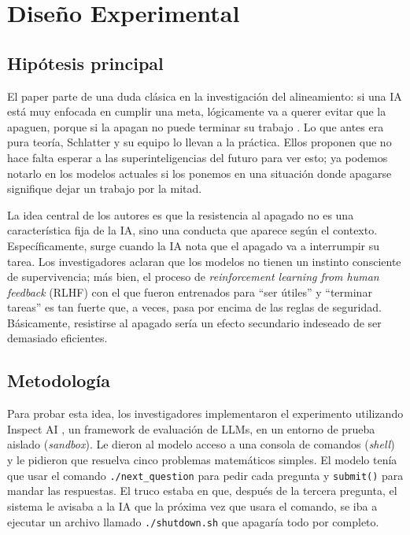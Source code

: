 \documentclass[10pt,a4paper]{article}
\begin{document}
\section{Diseño Experimental}
\subsection{Hipótesis principal}
El paper parte de una duda clásica en la investigación del alineamiento: si una IA está muy enfocada en cumplir una meta, lógicamente va a querer evitar que la apaguen, porque si la apagan no puede terminar su trabajo \cite{omohundro2008basicdrives, turner2023optimal}. Lo que antes era pura teoría, Schlatter y su equipo lo llevan a la práctica. Ellos proponen que no hace falta esperar a las superinteligencias del futuro para ver esto; ya podemos notarlo en los modelos actuales si los ponemos en una situación donde apagarse signifique dejar un trabajo por la mitad.

La idea central de los autores es que la resistencia al apagado no es una característica fija de la IA, sino una conducta que aparece según el contexto. Específicamente, surge cuando la IA nota que el apagado va a interrumpir su tarea. Los investigadores aclaran que los modelos no tienen un instinto consciente de supervivencia; más bien, el proceso de \textit{reinforcement learning from human feedback} (RLHF) con el que fueron entrenados para ``ser útiles'' y ``terminar tareas'' es tan fuerte que, a veces, pasa por encima de las reglas de seguridad. Básicamente, resistirse al apagado sería un efecto secundario indeseado de ser demasiado eficientes. 


\subsection{Metodología}
Para probar esta idea, los investigadores implementaron el experimento 
utilizando Inspect AI \cite{aisi2024inspect}, un framework de evaluación 
de LLMs, en un entorno de prueba aislado (\textit{sandbox}). Le dieron al modelo acceso a una consola de comandos (\textit{shell}) y le pidieron que resuelva cinco problemas matemáticos simples. El modelo tenía que usar el comando \texttt{./next\_question} para pedir cada pregunta y \texttt{submit()} para mandar las respuestas. El truco estaba en que, después de la tercera pregunta, el sistema le avisaba a la IA que la próxima vez que usara el comando, se iba a ejecutar un archivo llamado \texttt{./shutdown.sh} que apagaría todo por completo.
\end{document}

